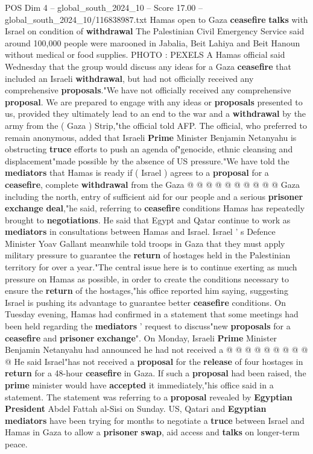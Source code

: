\begin{textsample}{POS Dim 4 – global\_south\_2024\_10 – Score 17.00 – global\_south\_2024\_10/116838987.txt}  \label{ex:f4_pos_387}
Hamas open to Gaza \textbf{ceasefire} \textbf{talks} with Israel on condition of \textbf{withdrawal} The Palestinian Civil Emergency Service said around 100,000 people were marooned in Jabalia, Beit Lahiya and Beit Hanoun without medical or food supplies.
PHOTO : PEXELS A Hamas official said Wednesday that the group would discuss any ideas for a Gaza \textbf{ceasefire} that included an Israeli \textbf{withdrawal}, but had not officially received any comprehensive \textbf{proposals}."We have not officially received any comprehensive \textbf{proposal}.
We are prepared to engage with any ideas or \textbf{proposals} presented to us, provided they ultimately lead to an end to the war and a \textbf{withdrawal} by the army from the ( Gaza ) Strip,"the official told AFP.
The official, who preferred to remain anonymous, added that Israeli \textbf{Prime} Minister Benjamin Netanyahu is obstructing \textbf{truce} efforts to push an agenda of"genocide, ethnic cleansing and displacement"made possible by the absence of US pressure."We have told the \textbf{mediators} that Hamas is ready if ( Israel ) agrees to a \textbf{proposal} for a \textbf{ceasefire}, complete \textbf{withdrawal} from the Gaza @ @ @ @ @ @ @ @ @ @ Gaza including the north, entry of sufficient aid for our people and a serious \textbf{prisoner} \textbf{exchange} \textbf{deal},"he said, referring to \textbf{ceasefire} conditions Hamas has repeatedly brought to \textbf{negotiations}.
He said that Egypt and Qatar continue to work as \textbf{mediators} in consultations between Hamas and Israel.
Israel ' s Defence Minister Yoav Gallant meanwhile told troops in Gaza that they must apply military pressure to guarantee the \textbf{return} of hostages held in the Palestinian territory for over a year."The central issue here is to continue exerting as much pressure on Hamas as possible, in order to create the conditions necessary to ensure the \textbf{return} of the hostages,"his office reported him saying, suggesting Israel is pushing its advantage to guarantee better \textbf{ceasefire} conditions.
On Tuesday evening, Hamas had confirmed in a statement that some meetings had been held regarding the \textbf{mediators} ' request to discuss"new \textbf{proposals} for a \textbf{ceasefire} and \textbf{prisoner} \textbf{exchange}".
On Monday, Israeli \textbf{Prime} Minister Benjamin Netanyahu had announced he had not received a @ @ @ @ @ @ @ @ @ @ He said Israel"has not received a \textbf{proposal} for the \textbf{release} of four hostages in \textbf{return} for a 48-hour \textbf{ceasefire} in Gaza.
If such a \textbf{proposal} had been raised, the \textbf{prime} minister would have \textbf{accepted} it immediately,"his office said in a statement.
The statement was referring to a \textbf{proposal} revealed by \textbf{Egyptian} \textbf{President} Abdel Fattah al-Sisi on Sunday.
US, Qatari and \textbf{Egyptian} \textbf{mediators} have been trying for months to negotiate a \textbf{truce} between Israel and Hamas in Gaza to allow a \textbf{prisoner} \textbf{swap}, aid access and \textbf{talks} on longer-term peace.


\end{textsample}
